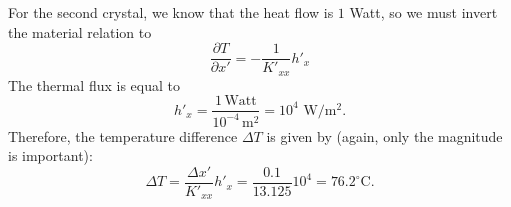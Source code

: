 \begin{example}
For the second crystal, we know that the heat flow is $1$ Watt, so we must invert the material relation to
\[
	\frac{\partial T}{\partial x'} = -\frac{1}{K'_{xx}} h'_x 
\]
The thermal flux is equal to 
\[
	h'_x = \frac{1\,\text{Watt}}{10^{-4}\,\text{m$^2$}} = 10^4\,\,\text{W/m$^2$}.
\]
Therefore, the temperature difference $\Delta T$ is given by (again, only the magnitude is important):
\[
	\Delta T = \frac{\Delta x'}{K'_{xx}} h'_x =  \frac{0.1}{13.125}10^4 = 76.2^{\circ}\text{C}.
\]
\end{example}







